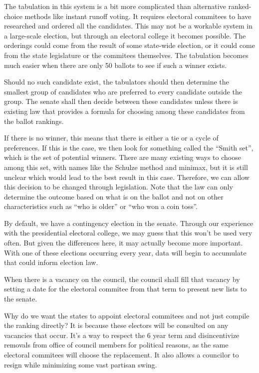 \documentclass{article}
\begin{document}
The tabulation in this system is a bit more complicated than alternative ranked-choice methods like instant runoff voting. It requires electoral commitees to have researched and ordered all the candidates. This may not be a workable system in a large-scale election, but through an electoral college it becomes possible. The orderings could come from the result of some state-wide election, or it could come from the state legislature or the commitees themselves. The tabulation becomes much easier when there are only 50 ballots to see if such a winner exists.

\begin{quoting}
Should no such candidate exist, the tabulators should then determine the smallest group of candidates who are preferred to every candidate outside the group. The senate shall then decide between these candidates unless there is existing law that provides a formula for choosing among these candidates from the ballot rankings.
\end{quoting}

If there is no winner, this means that there is either a tie or a cycle of preferences. If this is the case, we then look for something called the “Smith set”, which is the set of potential winners. There are many existing ways to choose among this set, with names like the Schulze method\cite{Schulze} and minimax, but it is still unclear which would lead to the best result in this case. Therefore, we can allow this decision to be changed through legislation. Note that the law can only determine the outcome based on what is on the ballot and not on other characteristics such as “who is older” or “who won a coin toss”.

By default, we have a contingency election in the senate. Through our experience with the presidential electoral college, we may guess that this won’t be used very often. But given the differences here, it may actually become more important. With one of these elections occurring every year, data will begin to accumulate that could inform election law.

\begin{quoting}
When there is a vacancy on the council, the council shall fill that vacancy by setting a date for the electoral commitee from that term to present new lists to the senate.
\end{quoting}

Why do we want the states to appoint electoral commitees and not just compile the ranking directly? It is because these electors will be consulted on any vacancies that occur. It’s a way to respect the 6 year term and disincentivize removals from office of council members for political reasons, as the same electoral commitees will choose the replacement. It also allows a councilor to resign while minimizing some vast partisan swing.
\end{document}
